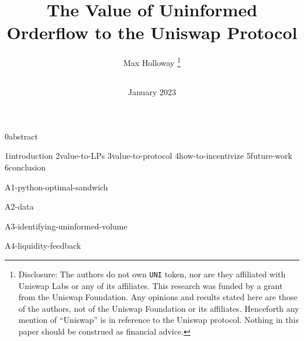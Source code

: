 \documentclass{article}
\title{The Value of Uninformed Orderflow to the Uniswap Protocol}
\author{
    Max Holloway \footnote{Disclosure: The authors do not own \texttt{UNI} token, nor are they affiliated with Uniswap Labs or any of its affiliates. This research was funded by a grant from the Uniswap Foundation. Any opinions and results stated here are those of the authors, not of the Uniswap Foundation or its affiliates. Henceforth any mention of ``Uniswap'' is in reference to the Uniswap protocol. Nothing in this paper should be construed as financial advice.} \\
    \texttt{
        \href{mailto:max@xenophonlabs.com}{\color{black}{max@xenophonlabs.com}}
    } 
}
\date{January 2023}
\begin{document}
    \maketitle    
    {0abstract}
    \tableofcontents
    \newpage
    
    {1introduction}
    {2value-to-LPs}
    {3value-to-protocol}
    {4how-to-incentivize}
    {5future-work}
    {6conclusion}
    
    \appendix
    \newpage
    {A1-python-optimal-sandwich}
    
    \newpage
    {A2-data}
    
    \newpage
    {A3-identifying-uninformed-volume}

    \newpage
    {A4-liquidity-feedback}

    \newpage
    \printbibliography
    
\end{document}
